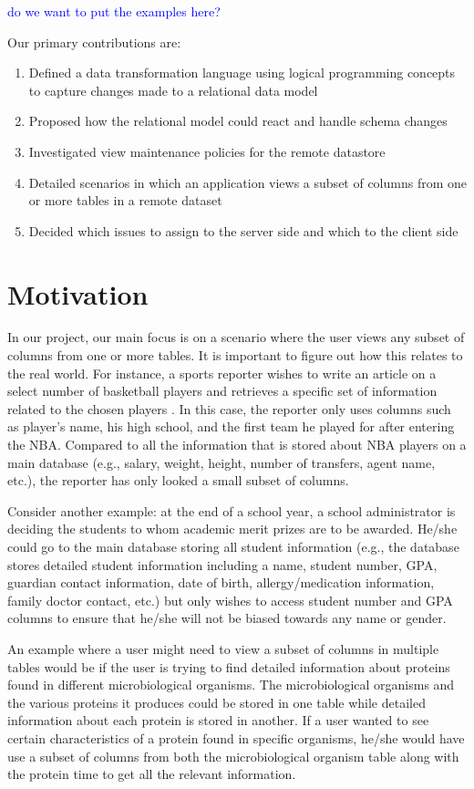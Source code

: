\documentclass[12pt]{article}
\begin{document}
\noindent \textcolor{blue}{do we want to put the examples here?}

\noindent Our primary contributions are:
\begin{enumerate}
	\item{Defined a data transformation language using logical programming concepts to capture changes made to a relational data model}
	\item{Proposed how the relational model could react and handle schema changes}
	\item{Investigated view maintenance policies for the remote datastore}
	\item{Detailed scenarios in which an application views a subset of columns from one or more tables in a remote dataset}
	\item{Decided which issues to assign to the server side and which to the client side}
\end{enumerate}

\section{Motivation}
In our project, our main focus is on a scenario where the user views any subset of columns from one or more tables. It is important to figure out how this relates to the real world.  For instance, a sports reporter wishes to write an article on a select number of basketball players and retrieves a specific set of information related to the chosen players \cite{arniThesis}. In this case, the reporter only uses columns such as player's name, his high school, and the first team he played for after entering the NBA. Compared to all the information that is stored about NBA players on a main database (e.g., salary, weight, height, number of transfers, agent name, etc.), the reporter has only looked a small subset of columns. 

Consider another example: at the end of a school year, a school administrator is deciding the students to whom academic merit prizes are to be awarded.  He/she could go to the main database storing all student information (e.g., the database stores detailed student information including a name, student number, GPA, guardian contact information, date of birth, allergy/medication information, family doctor contact, etc.) but only wishes to access student number and GPA columns to ensure that he/she will not be biased towards any name or gender.

An example where a user might need to view a subset of columns in multiple tables would be if the user is trying to find detailed information about proteins found in different microbiological organisms. The microbiological organisms and the various proteins it produces could be stored in one table while detailed information about each protein is stored in another. If a user wanted to see certain characteristics of a protein found in specific organisms, he/she would have use a subset of columns from both the microbiological organism table along with the protein time to get all the relevant information.
\end{document}
